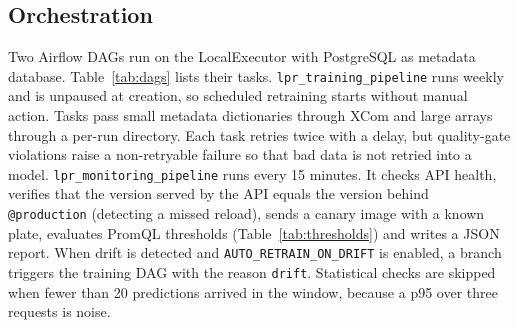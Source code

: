 \documentclass[conference]{IEEEtran}
\newcommand{\code}[1]{\texttt{#1}}
\begin{document}
\subsection{Orchestration}
Two Airflow DAGs run on the LocalExecutor with PostgreSQL as metadata database.
Table~\ref{tab:dags} lists their tasks.
\code{lpr\_training\_pipeline} runs weekly and is unpaused at creation, so
scheduled retraining starts without manual action. Tasks pass small metadata
dictionaries through XCom and large arrays through a per-run directory. Each
task retries twice with a delay, but quality-gate violations raise a
non-retryable failure so that bad data is not retried into a model.
\code{lpr\_monitoring\_pipeline} runs every 15 minutes. It checks API health,
verifies that the version served by the API equals the version behind
\code{@production} (detecting a missed reload), sends a canary image with a
known plate, evaluates PromQL thresholds (Table~\ref{tab:thresholds}) and writes
a JSON report. When drift is detected and \code{AUTO\_RETRAIN\_ON\_DRIFT} is
enabled, a branch triggers the training DAG with the reason \code{drift}.
Statistical checks are skipped when fewer than 20 predictions arrived in the
window, because a p95 over three requests is noise.
\end{document}
